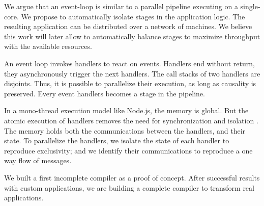 We argue that an event-loop is similar to a parallel pipeline executing on a single-core.
We propose to automatically isolate stages in the application logic.
The resulting application can be distributed over a network of machines.
We believe this work will later allow to automatically balance stages to maximize throughput with the available resources.


An event loop invokes handlers to react on events.
Handlers end without return, they asynchronously trigger the next handlers.
The call stacks of two handlers are disjoints.
Thus, it is possible to parallelize their execution, as long as causality is preserved.
Every event handlers becomes a stage in the pipeline.

In a mono-thread execution model like Node.js, the memory is global.
But the atomic execution of handlers removes the need for synchronization and isolation \cite{Adya2002}.
The memory holds both the communications between the handlers, and their state.
To parallelize the handlers, we isolate the state of each handler to reproduce exclusivity; and we identify their communications to reproduce a one way flow of messages.

We built a first incomplete compiler as a proof of concept.
After successful results with custom applications, we are building a complete compiler to transform real applications.







